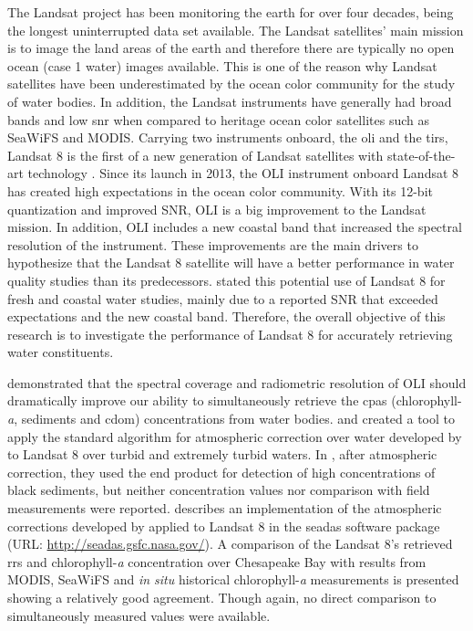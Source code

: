 The Landsat project has been monitoring the earth for over four decades, being the longest uninterrupted data set available. The Landsat satellites' main mission is to image the land areas of the earth and therefore there are typically no open ocean (case 1 water) images available. This is one of the reason why Landsat satellites have been underestimated by the ocean color community for the study of water bodies. In addition, the Landsat instruments have generally had broad bands and low \acrfull{snr} when compared to heritage ocean color satellites such as SeaWiFS and MODIS. Carrying two instruments onboard, the \acrfull{oli} and the \acrfull{tirs}, Landsat 8 is the first of a new generation of Landsat satellites with state-of-the-art technology \citep{Irons:2012}. Since its launch in 2013, the OLI instrument onboard Landsat 8 has created high expectations in the ocean color community. With its 12-bit quantization and improved SNR, OLI is a big improvement to the Landsat mission. In addition, OLI includes a new coastal band that increased the spectral resolution of the instrument. These improvements are the main drivers to hypothesize that the Landsat 8 satellite will have a better performance in water quality studies than its predecessors. \citet{Roy:2014} stated this potential use of Landsat 8 for fresh and coastal water studies, mainly due to a reported SNR that exceeded expectations and the new coastal band. Therefore, the overall objective of this research is to investigate the performance of Landsat 8 for accurately retrieving water constituents.

\citet{Gerace:2013} demonstrated that the spectral coverage and radiometric resolution of OLI should dramatically improve our ability to simultaneously retrieve the \acrfull{cpas} (chlorophyll-{\it a}, sediments and \acrfull{cdom}) concentrations from water bodies. \citet{Vanhellemont2014} and \citet{Vanhellemont:2015} created a tool to apply the standard algorithm for atmospheric correction over water developed by \citet{Gordon:1994} to Landsat 8 over turbid and extremely turbid waters. In \citet{Vanhellemont:2015}, after atmospheric correction, they used the end product for detection of high concentrations of black sediments, but neither concentration values nor comparison with field measurements were reported. \citet{Franz:2015} describes an implementation of the atmospheric corrections developed by \citet{Gordon:1994} applied to Landsat 8 in the \acrfull{seadas} software package (URL: \url{http://seadas.gsfc.nasa.gov/}). A comparison of the Landsat 8's retrieved \acrfull{rrs} and chlorophyll-{\it a} concentration over Chesapeake Bay with results from MODIS, SeaWiFS and {\it in situ} historical chlorophyll-{\it a} measurements is presented showing a relatively good agreement. Though again, no direct comparison to simultaneously measured values were available.

